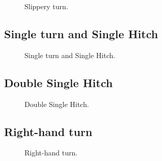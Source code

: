 \begin{figure}[H]\centering
	\begin{minipage}{1\linewidth}
		\begin{center}
			\tcbox[enhanced jigsaw,colframe=black,opacityframe=0.5,opacityback=0.5]
			{\centering{}}
		\end{center}
	\end{minipage}
\caption{Slippery turn.}
\label{ris:Slippery_turn}
\end{figure}

\subsection{Single turn and Single Hitch}

\begin{figure}[H]\centering
	\begin{minipage}{1\linewidth}
		\begin{center}
			\tcbox[enhanced jigsaw,colframe=black,opacityframe=0.5,opacityback=0.5]
			{\centering{}}
		\end{center}
	\end{minipage}
\caption{Single turn and Single Hitch.}
\label{ris:Single_turn_and_Single_Hitch}
\end{figure}

\subsection{Double Single Hitch}

\begin{figure}[H]\centering
	\begin{minipage}{1\linewidth}
		\begin{center}
			\tcbox[enhanced jigsaw,colframe=black,opacityframe=0.5,opacityback=0.5]
			{\centering{}}
		\end{center}
	\end{minipage}
\caption{Double Single Hitch.}
\label{ris:Double_Single_Hitch}
\end{figure}

\subsection{Right-hand turn}

\begin{figure}[H]\centering
	\begin{minipage}{1\linewidth}
		\begin{center}
			\tcbox[enhanced jigsaw,colframe=black,opacityframe=0.5,opacityback=0.5]
			{\centering{}}
		\end{center}
	\end{minipage}
\caption{Right-hand turn.}
\label{ris:right-hand_turn}
\end{figure}

